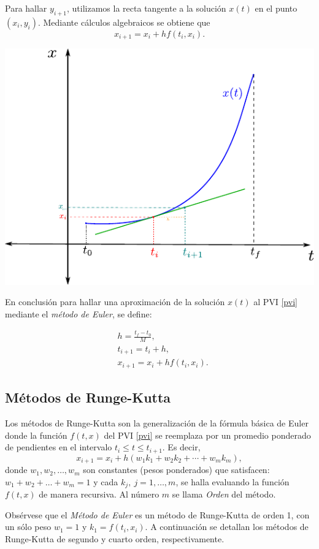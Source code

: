 \documentclass[12pt,letterpaper]{article}
\begin{document}
\parbox{12cm}{Para hallar $y_{i+1}$, utilizamos la recta tangente a la solución $x(t)$ en el punto $(x_i, y_i)$. Mediante cálculos algebraicos se obtiene que
\[
x_{i+1} = x_i + h f(t_i, x_i).    
\]}\hfill
\parbox{5.5cm}{\includegraphics[scale=0.6]{images/GraficaEuler.pdf}}

En conclusión para hallar una aproximación de la solución $x(t)$ al PVI \eqref{pvi} mediante el {\it método de Euler}, se define:

\begin{align*}
    & h=\frac{t_f-t_0}{M},\\
    & t_{i+1}=t_{i}+h, \\
    & x_{i+1} = x_i + h f(t_i, x_i).
\end{align*}

\subsection{Métodos de Runge-Kutta}
Los métodos de Runge-Kutta son la generalización de la fórmula básica de Euler donde la función $f(t,x)$ del PVI \eqref{pvi} se reemplaza por un promedio ponderado de pendientes en el intervalo $t_i \leq t \leq t_{i+1}$. Es decir,
\[
x_{i+1} = x_i + h(w_1k_1 + w_2k_2 + \cdots + w_mk_m),
\]
donde $w_1, w_2, \ldots, w_m$ son constantes (pesos ponderados) que satisfacen: $w_1 + w_2 + \ldots + w_m = 1$ y cada $k_j, \ j=1, \ldots, m$, se halla evaluando la función $f(t,x)$ de manera recursiva. Al número $m$ se llama {\it Orden} del método.

Obsérvese que el {\it Método de Euler} es un método de Runge-Kutta de orden 1, con un sólo peso $w_1=1$ y $k_1=f(t_i,x_i)$. A continuación se detallan los métodos de Runge-Kutta de segundo y cuarto orden, respectivamente.
\end{document}
